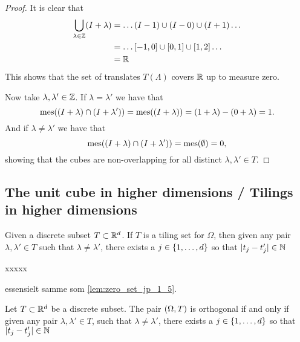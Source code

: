 \documentclass[../thesis.tex]{subfiles}
\begin{document}
\begin{proof}
    It is clear that
    \begin{align*}
        \bigcup_{\lambda\in \mathbb{Z}} (I + \lambda) &= \dots (I-1) \cup (I-0) \cup (I+1) \dots\\ 
        &= \dots [-1,0] \cup [0,1] \cup [1,2] \dots\\
        &= \mathbb{R}
    \end{align*}
    This shows that the set of translates $T(\Lambda)$ covers $\mathbb{R}$ up to measure zero. 
    
    Now take $\lambda,\lambda' \in \mathbb{Z}$. If $\lambda = \lambda'$ we have that
    \begin{equation*}
        \operatorname{mes}((I+\lambda) \cap (I+\lambda')) = \operatorname{mes}((I+\lambda)) = (1+\lambda) - (0+\lambda) = 1.
    \end{equation*}
    And if $\lambda \neq \lambda'$ we have that 
    \begin{equation*}
        \operatorname{mes}((I+\lambda) \cap (I+\lambda')) = \operatorname{mes}(\emptyset) = 0,
    \end{equation*}
    showing that the cubes are non-overlapping for all distinct $\lambda , \lambda' \in T$. 
\end{proof}


\subsection{The unit cube in higher dimensions / Tilings in higher dimensions}

\begin{theorem}\label{thrm:keller_tiling}
    Given a discrete subset $T\subset \mathbb{R}^d$. If $T$ is a tiling set for $\Omega$, then given any pair $\lambda, \lambda' \in T$ such that $\lambda\neq\lambda'$, there exists a $j\in \{1,\dots,d\}$ so that $|t_j -t_j' | \in \mathbb{N}$
\end{theorem}

xxxxx

essensielt samme som \cref{lem:zero_set_jp_1_5}. %
\begin{lemma}\label{lem:zero_set_AiSp}
    Let $T\subset \mathbb{R}^d$ be a discrete subset. The pair $(\Omega,T)$ is orthogonal if and only if given any pair $\lambda, \lambda' \in T$, such that $\lambda\neq\lambda'$, there exists a $j\in \{1,\dots,d\}$ so that $|t_j -t_j' | \in \mathbb{N}$
\end{lemma}
\end{document}
